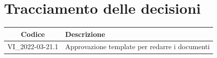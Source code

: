 \documentclass[12pt, a4paper,table]{article}
\begin{document}
	\section*{Tracciamento delle decisioni}
	\renewcommand{\arraystretch}{1.8} %
	\begin{tabular}{ |c|l| }
		\hline
		\textbf{Codice} & \textbf{Descrizione} \\
		\hline
		VI\_2022-03-21.1 & Approvazione template per redarre i documenti \\ \hline
	\end{tabular}
\end{document}
